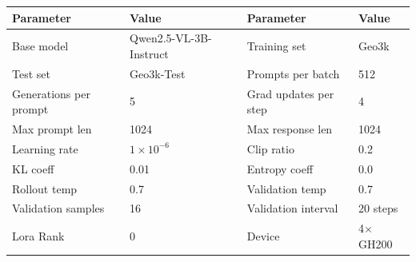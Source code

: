 \documentclass{article}
\theoremstyle{plain}
\theoremstyle{definition}
\theoremstyle{remark}
\begin{document}
\begin{table}[h]
  \centering
  \label{tab:config-3b-vl}
  \begin{tcolorbox}[
    enhanced, hbox,
    title={Training setup of Qwen2.5-VL-3B-Instruct},
    colback=teal!5, colframe=teal, coltext=black, coltitle=white,
    fonttitle=\bfseries, arc=1mm, boxrule=1pt, boxsep=1pt,
    left=2pt, right=2pt, top=0pt, bottom=2pt,
    toptitle=3pt, bottomtitle=3pt, center
  ]
    \small
    \renewcommand{\arraystretch}{1.2}
    \setlength{\tabcolsep}{8pt}
    \begin{tabular}{l|l|l|l}
      \textbf{Parameter} & \textbf{Value} & \textbf{Parameter} & \textbf{Value} \\
      \hline
      Base model & Qwen2.5-VL-3B-Instruct & Training set & Geo3k \\
      Test set & Geo3k-Test & Prompts per batch & 512 \\
      Generations per prompt & 5 & Grad updates per step & 4 \\
      Max prompt len & 1024 & Max response len & 1024 \\
      Learning rate & $1 \times 10^{-6}$ & Clip ratio & 0.2 \\
      KL coeff & 0.01 & Entropy coeff & 0.0 \\
      Rollout temp & 0.7 & Validation temp & 0.7 \\
      Validation samples & 16 & Validation interval & 20 steps \\
      Lora Rank & 0 & Device & 4$\times$GH200 \\
    \end{tabular}
  \end{tcolorbox}
\end{table}
\end{document}
